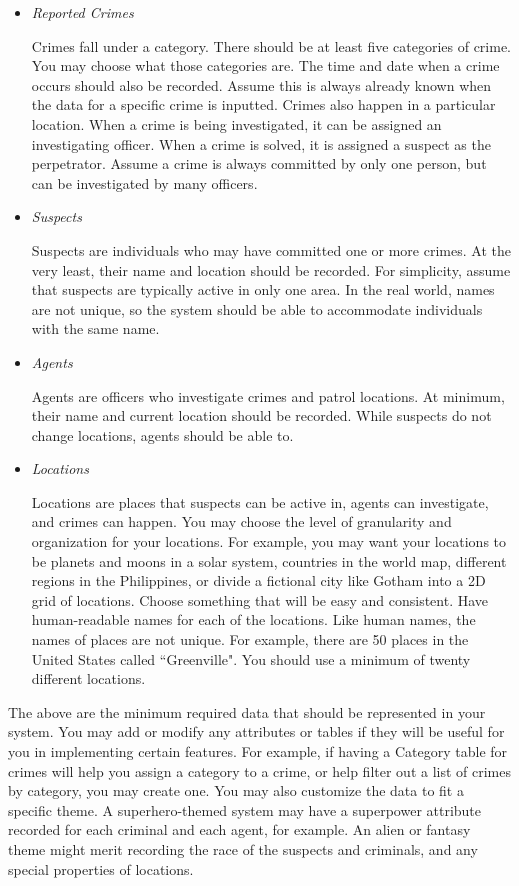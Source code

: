 \documentclass[12pt]{article}
\begin{document}
\begin{itemize}
\item \textit{Reported Crimes}

Crimes fall under a category. There should be at least five categories of crime. You may choose what those categories are. The time and date when a crime occurs should also be recorded. Assume this is always already known when the data for a specific crime is inputted. Crimes also happen in a particular location. When a crime is being investigated, it can be assigned an investigating officer. When a crime is solved, it is assigned a suspect as the perpetrator. Assume a crime is always committed by only one person, but can be investigated by many officers.

\item \textit{Suspects}

Suspects are individuals who may have committed one or more crimes. At the very least, their name and location should be recorded. For simplicity, assume that suspects are typically active in only one area. In the real world, names are not unique, so the system should be able to accommodate individuals with the same name. 

\item \textit{Agents}

Agents are officers who investigate crimes and patrol locations. At minimum, their name and current location should be recorded. While suspects do not change locations, agents should be able to. 

\item \textit{Locations}

Locations are places that suspects can be active in, agents can investigate, and crimes can happen. You may choose the level of granularity and organization for your locations. For example, you may want your locations to be planets and moons in a solar system, countries in the world map, different regions in the Philippines, or divide a fictional city like Gotham into a 2D grid of locations. Choose something that will be easy and consistent. Have human-readable names for each of the locations. Like human names, the names of places are not unique. For example, there are 50 places in the United States called ``Greenville". You should use a minimum of twenty different locations.

\end{itemize}

The above are the minimum required data that should be represented in your system. You may add or modify any attributes or tables if they will be useful for you in implementing certain features. For example, if having a Category table for crimes will help you assign a category to a crime, or help filter out a list of crimes by category, you may create one. You may also customize the data to fit a specific theme. A superhero-themed system may have a superpower attribute recorded for each criminal and each agent, for example. An alien or fantasy theme might merit recording the race of the suspects and criminals, and any special properties of locations.
\end{document}
